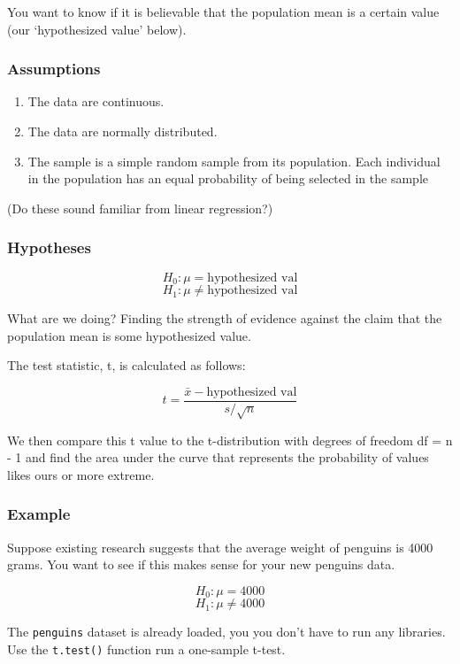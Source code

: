 \documentclass[
  openany]{book}
\providecommand{\tightlist}{%
  \setlength{\itemsep}{0pt}\setlength{\parskip}{0pt}}
\begin{document}
You want to know if it is believable that the population mean is a certain value (our `hypothesized value' below).

\hypertarget{assumptions}{%
\subsubsection{Assumptions}\label{assumptions}}

\begin{enumerate}
\def\labelenumi{\arabic{enumi}.}
\tightlist
\item
  The data are continuous.
\item
  The data are normally distributed.
\item
  The sample is a simple random sample from its population. Each individual in the population has an equal probability of being selected in the sample
\end{enumerate}

(Do these sound familiar from linear regression?)

\hypertarget{hypotheses}{%
\subsubsection{Hypotheses}\label{hypotheses}}

\[H_0: \mu = \text{hypothesized val}\]
\[H_1: \mu \ne \text{hypothesized val}\]

What are we doing? Finding the strength of evidence against the claim that the population mean is some hypothesized value.

The test statistic, t, is calculated as follows:

\[ t = \frac{\bar{x} - \text{hypothesized val}}{s/\sqrt{n}} \]

We then compare this t value to the t-distribution with degrees of freedom df = n - 1 and find the area under the curve that represents the probability of values likes ours or more extreme.

\hypertarget{example}{%
\subsubsection{Example}\label{example}}

Suppose existing research suggests that the average weight of penguins is 4000 grams. You want to see if this makes sense for your new penguins data.

\[H_0: \mu = 4000\]
\[H_1: \mu \ne 4000\]

The \texttt{penguins} dataset is already loaded, you you don't have to run any libraries. Use the \texttt{t.test()} function run a one-sample t-test.
\end{document}
